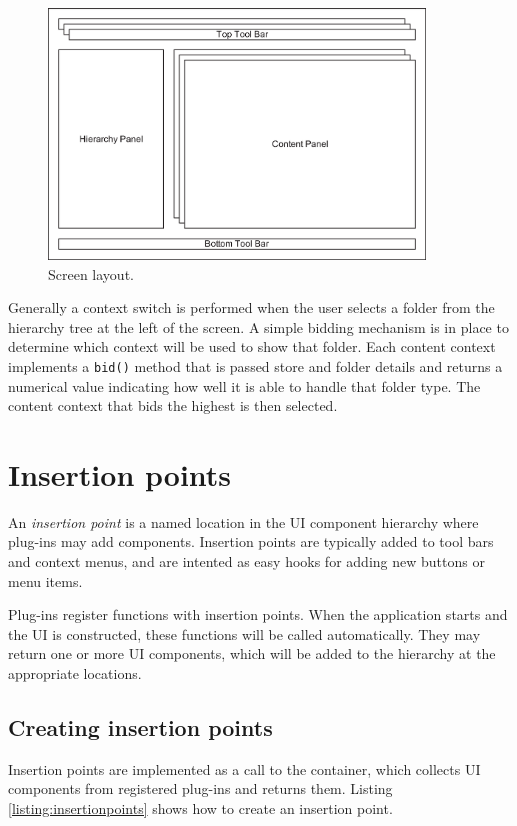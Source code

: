 \begin{figure}[h!]
\centering
\includegraphics[width=10cm]{figures/layout.eps}
\caption{Screen layout.}
\label{figure:layout}
\end{figure}

Generally a context switch is performed when the user selects a folder from the hierarchy tree at the left
of the screen. A simple bidding mechanism is in place to determine which context will be used to show that
folder. Each content context implements a {\tt bid()} method that is passed store and folder details and
returns a numerical value indicating how well it is able to handle that folder type. The content context
that bids the highest is then selected.

\section{Insertion points}
\label{section:insertionpoints}

An \emph{insertion point} is a named location in the UI component hierarchy where plug-ins may add components. 
Insertion points are typically added to tool bars and context menus, and are intented as easy hooks for adding 
new buttons or menu items.

Plug-ins register functions with insertion points. When the application starts and the UI is constructed, 
these functions will be called automatically. They may return one or more UI components, which will be added 
to the hierarchy at the appropriate locations.

\subsection{Creating insertion points}

Insertion points are implemented as a call to the container, which collects UI components from registered
plug-ins and returns them. Listing \ref{listing:insertionpoints} shows how to create an insertion point. 

